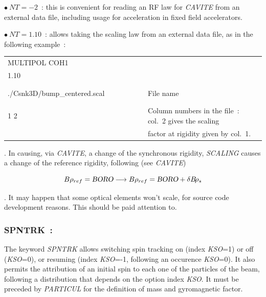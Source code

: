  \noindent $\bullet ~ NT = -2$~: this is convenient for reading an RF law for \textsl{CAVITE} from an external data file, 
including usage for acceleration in fixed field accelerators. 


 \noindent $\bullet ~ NT = 1.10$~: allows taking the scaling law from an external data file, as in the following example~:

\bigskip

{\renewcommand{\arraystretch}{1}
\noindent	\begin{tabular}{lll}
MULTIPOL COH1  \\
1.10             \\
./Csnk3D/bump\_centered.scal & ~ ~ ~ ~ ~ ~ ~ ~& File name \\
1   2  &     &  Column numbers in the file~: col.~2 gives the scaling \\[-.8ex]
       &      &  factor at rigidity given by col.~1. \\
	\end{tabular}   }

\bigskip


\medskip

. In causing, via \textsl{CAVITE}, a change of the synchronous rigidity, \textsl{SCALING} causes 
a change of the reference rigidity, following (see \textsl{CAVITE})     

$$B\rho_{ref} = \textsl{BORO} \longrightarrow B\rho_{ref} = \textsl{BORO} + \delta B\!\rho_s$$ 


\medskip

. It may happen that some optical elements won't scale, for source code development reasons. 
This should be paid attention to. 



\newpage

\subsubsection*{SPNTRK~: \SPNTRKTitl} \label{SPNTRK} 
\medskip

The keyword \textsl{SPNTRK} allows switching  spin tracking on (index \textsl{KSO}=1) or off (\textsl{KSO}=0), 
or resuming (index \textsl{KSO}=-1, following an occurence \textsl{KSO}=0). 
 It also permits the attribution of an initial spin to each one of the 
\IMAX{} particles of the beam, following a distribution that depends 
on the option index \textsl{KSO}. It must be preceded by \textsl{PARTICUL} for
the definition of  mass and gyromagnetic factor.  
\medskip


